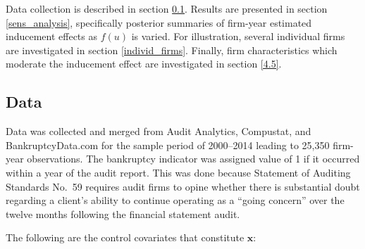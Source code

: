 \documentclass[aoas,preprint, 11pt, dvipsnames, table, x11name]{imsart}
\renewcommand{\bm}[1]{\mathbf{#1}}
\theoremstyle{remark}
\begin{document}
	Data collection is described in section \ref{data_section}.  Results are presented in section \ref{sens_analysis}, specifically posterior summaries of firm-year estimated inducement effects as $f(u)$ is varied.  For illustration, several individual firms are investigated in section \ref{individ_firms}.  Finally, firm characteristics which moderate the inducement effect are investigated in section \ref{4.5}.
	
	\subsection{Data}\label{data_section} Data was collected and merged from Audit Analytics, Compustat, and BankruptcyData.com for the sample period of 2000--2014 leading to 25,350 firm-year observations. The bankruptcy indicator was assigned value of 1 if it occurred within a year of the audit report.  This was done because Statement of Auditing Standards No.~59 requires audit firms to opine whether there is substantial doubt regarding a client's ability to continue operating as a ``going concern'' over the twelve months following the financial statement audit.
	
	The following are the control covariates that constitute $\bm{x}$:
	
\end{document}
